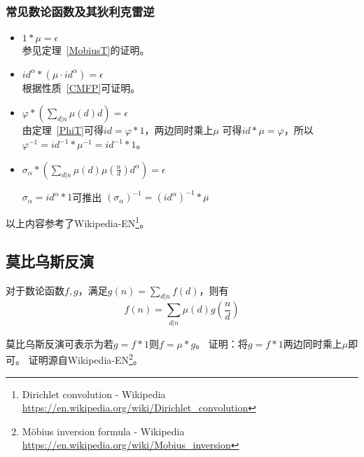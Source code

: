 \subsubsection{常见数论函数及其狄利克雷逆}
\begin{itemize}
	\item $1*\mu=\epsilon$\\
	      参见定理~\ref{MobiusT}的证明。
	\item $id^\alpha*(\mu\cdot id^\alpha)=\epsilon$\\
	      根据性质~\ref{CMFP}可证明。
	\item $\displaystyle \varphi*(\sum_{d|n}{\mu(d)d})=\epsilon$\\
	      由定理~\ref{PhiT}可得$id=\varphi*1$，两边同时乘上$\mu$
	      可得$id*\mu=\varphi$，所以$\varphi^{-1}=id^{-1}*\mu^{-1}=id^{-1}*1$。
	\item $\sigma_\alpha*(\sum_{d|n}{\mu(d)\mu(\frac{n}{d})d^\alpha})=\epsilon$

	      $\sigma_\alpha=id^\alpha*1$可推出
	      $(\sigma_\alpha)^{-1}=(id^\alpha)^{-1}*\mu$
\end{itemize}
以上内容参考了Wikipedia-EN\footnote{Dirichlet convolution - Wikipedia\\
	\url{https://en.wikipedia.org/wiki/Dirichlet\_convolution}}。
\subsection{莫比乌斯反演}
\begin{theorem}
	对于数论函数$f,g$，满足$\displaystyle g(n)=\sum_{d|n}f(d)$，则有
	\begin{displaymath}
		f(n)=\sum_{d|n}\mu(d)g(\frac{n}{d})
	\end{displaymath}
\end{theorem}
莫比乌斯反演可表示为若$g=f*1$则$f=\mu*g$。
证明：将$g=f*1$两边同时乘上$\mu$即可。
证明源自Wikipedia-EN\footnote{Möbius inversion formula - Wikipedia\\
	\url{https://en.wikipedia.org/wiki/Mobius_inversion}}。
